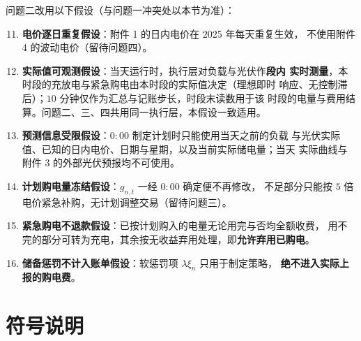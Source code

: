 \documentclass[withoutpreface,bwprint]{cumcmthesis}
\begin{document}
问题二改用以下假设（与问题一冲突处以本节为准）：

\begin{enumerate}
  \setcounter{enumi}{10}
  \item \textbf{电价逐日重复假设}：附件 1 的日内电价在 2025 年每天重复生效，
        不使用附件 4 的波动电价（留待问题四）。
  \item \textbf{实际值可观测假设}：当天运行时，执行层对负载与光伏作\textbf{段内
        实时测量}，本时段的充放电与紧急购电由本时段的实际值决定（理想即时
        响应、无控制滞后）；$10$ 分钟仅作为汇总与记账步长，时段末读数用于该
        时段的电量与费用结算。问题二、三、四共用同一执行层，本假设一致适用。
  \item \textbf{预测信息受限假设}：$0{:}00$ 制定计划时只能使用当天之前的负载
        与光伏实际值、已知的日内电价、日期与星期，以及当前实际储电量；当天
        实际曲线与附件 3 的外部光伏预报均不可使用。
  \item \textbf{计划购电量冻结假设}：$g_{n,t}$ 一经 $0{:}00$ 确定便不再修改，
        不足部分只能按 $5$ 倍电价紧急补购，无计划调整交易（留待问题三）。
  \item \textbf{紧急购电不退款假设}：已按计划购入的电量无论用完与否均全额收费，
        用不完的部分可转为充电，其余按无收益弃用处理，即\textbf{允许弃用已购电}。
  \item \textbf{储备惩罚不计入账单假设}：软惩罚项 $\lambda\xi_n$ 只用于制定策略，
        \textbf{绝不进入实际上报的购电费}。
\end{enumerate}

\section{符号说明}
\end{document}
